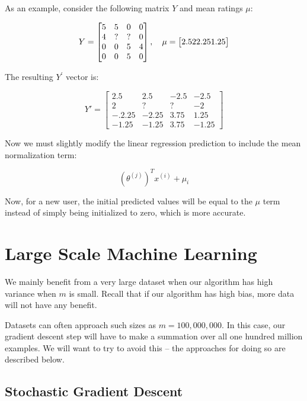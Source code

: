 \documentclass[a4paper,11pt]{report}
\begin{document}
As an example, consider the following matrix $Y$ and mean ratings $\mu$:

$$Y =
\begin{bmatrix}
    5 & 5 & 0 & 0  \\
    4 & ? & ? & 0  \\
    0 & 0 & 5 & 4 \\
    0 & 0 & 5 & 0 \\
\end{bmatrix}, 
\quad
 \mu =
\begin{bmatrix}
    2.5 \newline
    2  \newline
    2.25 \newline
    1.25 \newline
\end{bmatrix}$$

The resulting $Y^\prime$ vector is:

$$Y' =
\begin{bmatrix}
  2.5    & 2.5   & -2.5 & -2.5 \\
  2      & ?     & ?    & -2 \\
  -.2.25 & -2.25 & 3.75 & 1.25 \\
  -1.25  & -1.25 & 3.75 & -1.25
\end{bmatrix}$$

Now we must slightly modify the linear regression prediction to include the mean normalization term:

$$(\theta^{(j)})^T x^{(i)} + \mu_i$$

Now, for a new user, the initial predicted values will be equal to the $\mu$ term instead of simply being initialized to zero, which is more accurate.



\chapter{Large Scale Machine Learning}

We mainly benefit from a very large dataset when our algorithm has high variance when $m$ is small. Recall that if our algorithm has high bias, more data will not have any benefit.

Datasets can often approach such sizes as $m = 100,000,000$. In this case, our gradient descent step will have to make a summation over all one hundred million examples. We will want to try to avoid this -- the approaches for doing so are described below.

\section{Stochastic Gradient Descent}
\end{document}
